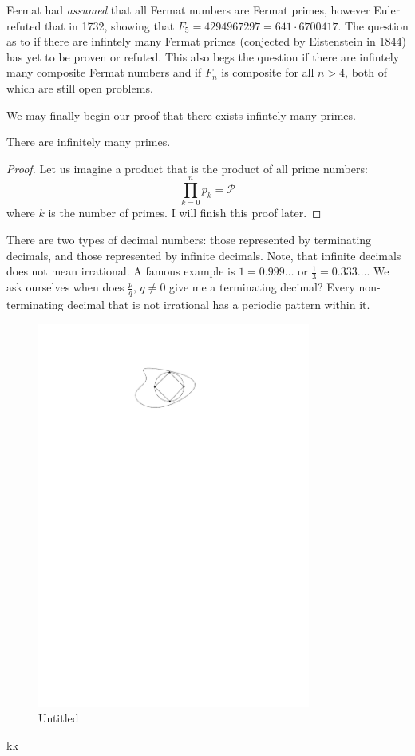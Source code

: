 \documentclass{article}
\begin{document}
Fermat had \textit{assumed} that all Fermat numbers are Fermat primes, however Euler refuted that in 1732, showing that \( F_5=4294967297=641\cdot 6700417 \). The question as to if there are infintely many Fermat primes (conjected by Eistenstein in 1844) has yet to be proven or refuted. This also begs the question if there are infintely many composite Fermat numbers and if \( F_n \) is composite for all \( n>4 \), both of which are still open problems.

We may finally begin our proof that there exists infintely many primes.

\begin{theorem}
  There are infinitely many primes. 
  
\end{theorem}


\begin{proof}
  Let us imagine a product that is the product of all prime numbers: 
  \[
    \prod_{k=0}^{n} p_k=\mathcal{P}
  \] 
  where \( k \) is the number of primes. I will finish this proof later. 
\end{proof}

There are two types of decimal numbers: those represented by terminating decimals, and those represented by infinite decimals. Note, that infinite decimals does not mean irrational. A famous example is \( 1=0.999\ldots  \) or \( \frac{1}{3}=0.333\ldots  \). We ask ourselves when does \( \frac{p}{q}, \, q\neq 0\) give me a terminating decimal? Every non-terminating decimal that is not irrational has a periodic pattern within it. 



\begin{figure}[ht]
    \centering
    \includegraphics[width=0.8\textwidth]{./figures/Untitled.pdf}
 \caption{Untitled}
    \label{fig:drawing1}
\end{figure}kk
\end{document}
